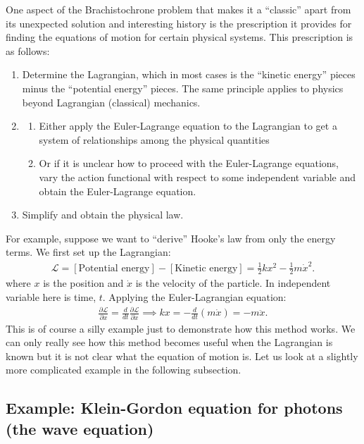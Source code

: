 \documentclass{article}
\newcommand{\p}{\partial}
\newcommand{\lag}{\mathcal{L}}
\newcommand{\f}[2]{\frac{#1}{#2}}
\begin{document}
One aspect of the Brachistochrone problem that makes it a ``classic'' apart from its unexpected solution and interesting history is the prescription it provides for finding the equations of motion for certain physical systems. This prescription is as follows:
\begin{enumerate}
	\item Determine the Lagrangian, which in most cases is the ``kinetic energy'' pieces minus the ``potential energy'' pieces. The same principle applies to physics beyond Lagrangian (classical) mechanics. 
	\item \begin{enumerate}
		\item Either apply the Euler-Lagrange equation to the Lagrangian to get a system of relationships among the physical quantities
		\item Or if it is unclear how to proceed with the Euler-Lagrange equations, vary the action functional with respect to some independent variable and obtain the Euler-Lagrange equation. 
	\end{enumerate}
	\item Simplify and obtain the physical law. 
\end{enumerate}

For example, suppose we want to ``derive'' Hooke's law from only the energy terms. We first set up the Lagrangian:
\begin{align}
\lag = [\text{Potential energy}] - [\text{Kinetic energy}] = \f{1}{2}kx^2 - \f{1}{2}m\dot{x}^2.
\end{align} 
where $x$ is the position and $\dot{x}$ is the velocity of the particle. In independent variable here is time, $t$. Applying the Euler-Lagrangian equation:
\begin{align}
\f{\p \lag}{\p x} = \f{d}{dt}\f{\p \lag}{\p \dot{x}} \implies kx = -\f{d}{dt}(m\dot{x}) = -m\ddot{x}.
\end{align}
This is of course a silly example just to demonstrate how this method works. We can only really see how this method becomes useful when the Lagrangian is known but it is not clear what the equation of motion is. Let us look at a slightly more complicated example in the following subsection.

\subsection{Example: Klein-Gordon equation for photons (the wave equation)}
\end{document}
